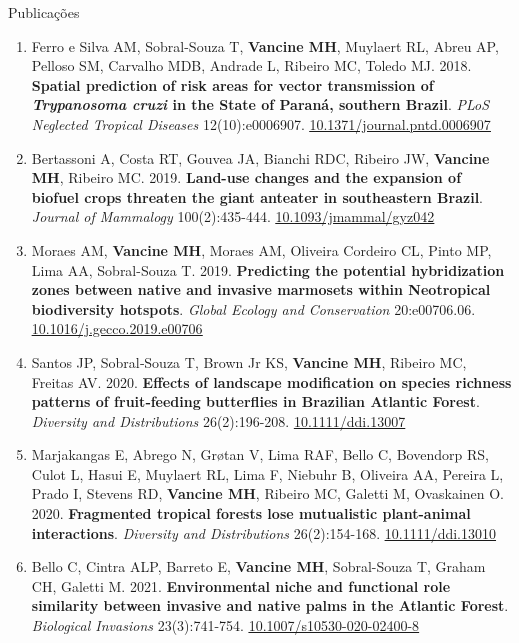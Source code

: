 \documentclass{resume}
\begin{document}
\begin{rSection}{Publicações}
\begin{enumerate}
\item Ferro e Silva AM, Sobral-Souza T, {\bf Vancine MH}, Muylaert RL, Abreu AP, Pelloso SM, Carvalho MDB, Andrade L, Ribeiro MC, Toledo MJ. 2018. {\bf Spatial prediction of risk areas for vector transmission of \textbf{\textit{Trypanosoma cruzi}} in the State of Paraná, southern Brazil}. {\it PLoS Neglected Tropical Diseases} 12(10):e0006907. \href{https://doi.org/10.1371/journal.pntd.0006907}{\underline{10.1371/journal.pntd.0006907}}

\item Bertassoni A, Costa RT, Gouvea JA, Bianchi RDC, Ribeiro JW, {\bf Vancine MH}, Ribeiro MC. 2019. {\bf Land-use changes and the expansion of biofuel crops threaten the giant anteater in southeastern Brazil}. {\it Journal of Mammalogy} 100(2):435-444. \href{https://doi.org/10.1093/jmammal/gyz042}{\underline{10.1093/jmammal/gyz042}}

\item Moraes AM, {\bf Vancine MH}, Moraes AM, Oliveira Cordeiro CL, Pinto MP, Lima AA, Sobral-Souza T. 2019. {\bf Predicting the potential hybridization zones between native and invasive marmosets within Neotropical biodiversity hotspots}. {\it Global Ecology and Conservation} 20:e00706.06. \href{https://doi.org/10.1016/j.gecco.2019.e00706}{\underline{10.1016/j.gecco.2019.e00706}}

\item Santos JP, Sobral‐Souza T, Brown Jr KS, {\bf Vancine MH}, Ribeiro MC, Freitas AV. 2020. {\bf Effects of landscape modification on species richness patterns of fruit‐feeding butterflies in Brazilian Atlantic Forest}. {\it Diversity and Distributions} 26(2):196-208. \href{https://doi.org/10.1111/ddi.13007}{\underline{10.1111/ddi.13007}}

\item Marjakangas E, Abrego N, Grøtan V, Lima RAF, Bello C, Bovendorp RS, Culot L, Hasui E, Muylaert RL, Lima F, Niebuhr B, Oliveira AA, Pereira L, Prado I, Stevens RD, {\bf Vancine MH}, Ribeiro MC, Galetti M, Ovaskainen O. 2020. {\bf Fragmented tropical forests lose mutualistic plant-animal interactions}. {\it Diversity and Distributions} 26(2):154-168. \href{https://doi.org/10.1111/ddi.13010}{\underline{10.1111/ddi.13010}}

\item Bello C, Cintra ALP, Barreto E, {\bf Vancine MH}, Sobral-Souza T, Graham CH, Galetti M. 2021. {\bf Environmental niche and functional role similarity between invasive and native palms in the Atlantic Forest}. {\it Biological Invasions} 23(3):741-754. \href{https://doi.org/10.1007/s10530-020-02400-8}{\underline{10.1007/s10530-020-02400-8}}


\end{enumerate}
\end{rSection}
\end{document}
